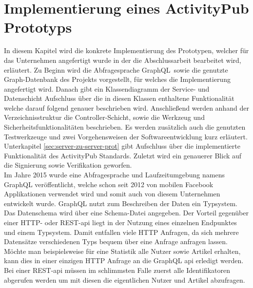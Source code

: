 
\chapter{Implementierung eines ActivityPub Prototyps}
In diesem Kapitel wird die konkrete Implementierung des Prototypen, welcher für das Unternehmen angefertigt wurde in der die Abschlussarbeit bearbeitet wird, erläutert. Zu Beginn wird die Abfragesprache \glqq GraphQL\grqq~sowie die genutzte Graph-Datenbank des Projekts vorgestellt, für welches die Implementierung angefertigt wird. Danach gibt ein Klassendiagramm der Service- und Datenschicht Aufschluss über die in diesen Klassen enthaltene Funktionalität welche darauf folgend genauer beschrieben wird. Anschließend werden anhand der Verzeichnisstruktur die Controller-Schicht, sowie die Werkzeug und Sicherheitsfunktionalitäten beschrieben. Es werden zusätzlich auch die genutzten Testwerkzeuge und zwei Vorgehensweisen der Softwareentwicklung kurz erläutert. Unterkapitel \ref{sec:server-zu-server-prot} gibt Aufschluss über die implementierte Funktionalität des ActivityPub Standards. Zuletzt wird ein genauerer Blick auf die Signierung sowie Verifikation geworfen.\\

Im Jahre 2015 wurde eine Abfragesprache und Laufzeitumgebung namens GraphQL veröffentlicht, welche schon seit 2012 von mobilen Facebook Applikationen verwendet wird und somit auch von diesem Unternehmen entwickelt wurde. GraphQL nutzt zum Beschreiben der Daten ein Typsystem. Das Datenschema wird über eine Schema-Datei angegeben\cite{graphql}. Der Vorteil gegenüber einer HTTP- oder REST-\gls{api} liegt in der Nutzung eines einzelnen Endpunktes und einem Typsystem. Damit entfallen viele HTTP Anfragen, da sich mehrere Datensätze verschiedenen Typs bequem über eine Anfrage anfragen lassen. Möchte man beispielsweise für eine Statistik alle Nutzer sowie Artikel erhalten, kann dies in einer einzigen HTTP Anfrage an die GraphQL \gls{api} erledigt werden. Bei einer REST-\gls{api} müssen im schlimmsten Falle zuerst alle Identifikatoren abgerufen werden um mit diesen die eigentlichen Nutzer und Artikel abzufragen.\\

